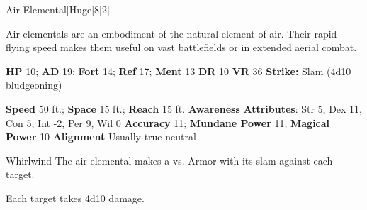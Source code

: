   \begin{monsection}{Air Elemental}[Huge]{8}[2]
    \vspace{-1em}\vspace{-1em}
    \vspace{0em}

    
    Air elementals are an embodiment of the natural element of air.
    Their rapid flying speed makes them useful on vast battlefields or in extended aerial combat.
  
    

    \begin{spellcontent}
      \begin{spelltargetinginfo}
        \pari \textbf{HP} 10;
          \textbf{AD} 19;
          \textbf{Fort} 14;
          \textbf{Ref} 17;
          \textbf{Ment} 13
        \pari \textbf{DR} 10
        \pari \textbf{VR} 36
        \pari \textbf{Strike:}
            Slam  (4d10 bludgeoning)
      \end{spelltargetinginfo}
    \end{spellcontent}
    \begin{monsterfooter}
      \pari \textbf{Speed} 50 ft.;
        \textbf{Space} 15 ft.;
        \textbf{Reach} 15 ft.
      \pari \textbf{Awareness} 
      \pari \textbf{Attributes}:
        Str 5, Dex 11,
        Con 5, Int -2,
        Per 9, Wil 0
      \pari \textbf{Accuracy} 11;
        \textbf{Mundane Power} 11;
      \textbf{Magical Power} 10
      \pari \textbf{Alignment} Usually true neutral
    \end{monsterfooter}
  \end{monsection}
  \begin{freeability}{Whirlwind}
       The air elemental makes a 
         vs. Armor
        with its slam against each target.
    
    \hit Each target takes 4d10  damage.
    \end{freeability}
  
